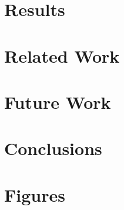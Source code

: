 \documentclass[a4paper]{report}
\begin{document}
	\chapter{Results} \label{chap:results}
	
	
	\chapter{Related Work} \label{chap:related-work}
	
	
	\chapter{Future Work} \label{chap:future-work}
	
	
	\chapter{Conclusions} \label{chap:conclusions}
	
	
	\titlespacing*{\chapter}{0pt}{0pt}{0pt}
	\appendix
	\chapter{Figures}
	
		
	\titleformat{\chapter}[display]
	{\normalfont\huge\bfseries}{\chaptertitlename\ \thechapter}{20pt}{\Huge}
	\titlespacing*{\chapter}{0pt}{0pt}{30pt}
	

	
\end{document}
